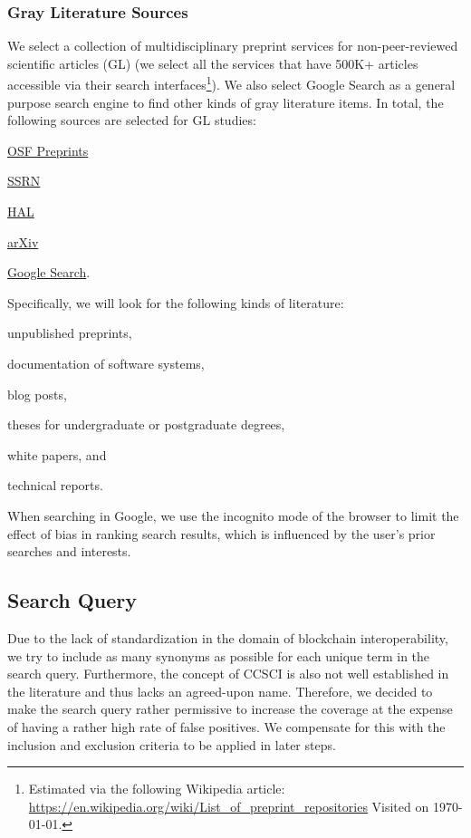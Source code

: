 \documentclass[review]{elsarticle}
\begin{document}
\subsubsection{Gray Literature Sources}
We select a collection of multidisciplinary preprint services for non-peer-reviewed scientific articles (GL) (we select all the services that have 500K+ articles accessible via their search interfaces\footnote{Estimated via the following Wikipedia article: \url{https://en.wikipedia.org/wiki/List_of_preprint_repositories} Visited on \today.}).
We also select Google Search as a general purpose search engine to find other kinds of gray literature items.
In total, the following sources are selected for GL studies:
\begin{inparaenum}[(i)]
	\item \href{https://osf.io/preprints/}{OSF Preprints}
	\item \href{https://papers.ssrn.com/sol3/DisplayAbstractSearch.cfm}{SSRN}
	\item \href{https://hal.archives-ouvertes.fr/}{HAL}
	\item \href{https://arxiv.org/}{arXiv}
	\item \href{https://google.com}{Google Search}.
\end{inparaenum}

Specifically, we will look for the following kinds of literature:
\begin{inparaenum}[(i)]
	\item unpublished preprints,
	\item documentation of software systems,
	\item blog posts,
	\item theses for undergraduate or postgraduate degrees,
	\item white papers, and
	\item technical reports.
\end{inparaenum}
When searching in Google, we use the incognito mode of the browser to limit the effect of bias in ranking search results, which is influenced by the user's prior searches and interests.


\subsection{Search Query}
Due to the lack of standardization in the domain of blockchain interoperability, we try to include as many synonyms as possible for each unique term in the search query.
Furthermore, the concept of CCSCI is also not well established in the literature and thus lacks an agreed-upon name.
Therefore, we decided to make the search query rather permissive to increase the coverage at the expense of having a rather high rate of false positives.
We compensate for this with the inclusion and exclusion criteria to be applied in later steps.
\end{document}
